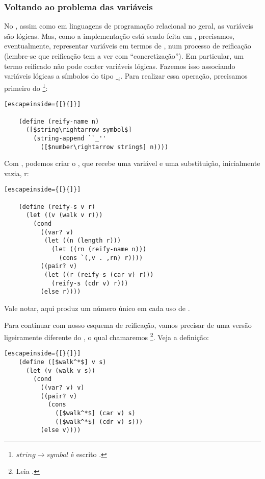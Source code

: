\documentclass{article}
\begin{document}
  \subsubsection{Voltando ao problema das variáveis}

  No , assim como em linguagens de programação
  relacional no geral, as variáveis são lógicas. Mas, como a
  implementação está sendo feita em , precisamos,
  eventualmente, representar variáveis em termos de
  , num processo de reificação (lembre-se que
  reificação tem a ver com ``concretização''). Em particular, um
  termo  reificado não pode conter variáveis
  lógicas. Fazemos isso associando variáveis lógicas a símbolos do
  tipo $\__i$. Para realizar essa operação, precisamos
  primeiro do \footnote{$string\rightarrow symbol$ é
    escrito .}:

  \begin{lstlisting}[escapeinside={[}{]}]

    (define (reify-name n)
      ([$string\rightarrow symbol$]
        (string-append ``_''
          ([$number\rightarrow string$] n))))

  \end{lstlisting}

  Com , podemos criar o , que
  recebe uma variável e uma substituição, inicialmente vazia, r:

  \begin{lstlisting}[escapeinside={[}{]}]

    (define (reify-s v r)
      (let ((v (walk v r)))
        (cond
          ((var? v)
           (let ((n (length r)))
             (let ((rn (reify-name n)))
               (cons `(,v . ,rn) r))))
          ((pair? v)
           (let ((r (reify-s (car v) r)))
             (reify-s (cdr v) r)))
          (else r))))

  \end{lstlisting}

  \noindent Vale notar, aqui  produz um número único
  em cada uso de .

  Para continuar com nosso esquema de reificação, vamos precisar de
  uma versão ligeiramente diferente do , o qual
  chamaremos \footnote{Leia .}. Veja a definição:
  
  \begin{lstlisting}[escapeinside={[}{]}]
    (define ([$walk^*$] v s)
      (let (v (walk v s))
        (cond
          ((var? v) v)
          ((pair? v)
            (cons
              ([$walk^*$] (car v) s)
              ([$walk^*$] (cdr v) s)))
          (else v))))
  \end{lstlisting}
\end{document}
